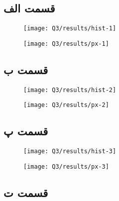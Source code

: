 \documentclass[12pt,onecolumn,a4paper]{article}
\theoremstyle{definition}
\begin{document}
	\FloatBarrier
	\subsection{قسمت الف}
	

	
	\begin{figure}[H]
		\centering
		\texttt{[image: Q3/results/hist-1]}
		\caption{}
		\label{fig:hist-1}
	\end{figure}


		
	\begin{figure}[H]
		\centering
		\texttt{[image: Q3/results/px-1]}
		\caption{}
		\label{fig:px-1}
	\end{figure}
	

	\FloatBarrier
	\subsection{قسمت ب}
	
	
	\begin{figure}[H]
		\centering
		\texttt{[image: Q3/results/hist-2]}
		\caption{}
		\label{fig:hist-2}
	\end{figure}


		
	\begin{figure}[H]
		\centering
		\texttt{[image: Q3/results/px-2]}
		\caption{}
		\label{fig:px-2}
	\end{figure}
	
	
	\FloatBarrier
	\subsection{قسمت پ}

		
	\begin{figure}[H]
		\centering
		\texttt{[image: Q3/results/hist-3]}
		\caption{}
		\label{fig:hist-3}
	\end{figure}


		
	\begin{figure}[H]
		\centering
		\texttt{[image: Q3/results/px-3]}
		\caption{}
		\label{fig:px-3}
	\end{figure}
	

	
	\FloatBarrier
	\subsection{قسمت ت}
\end{document}
